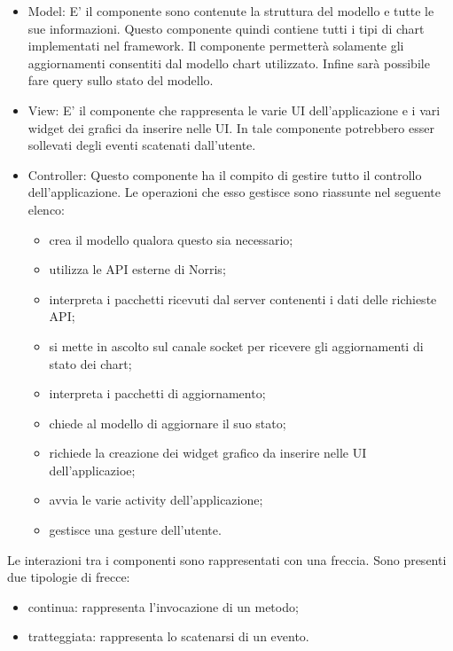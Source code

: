     	\begin{itemize}
            \item{Model:} 
        		E' il componente sono contenute la struttura del modello e tutte le sue informazioni. Questo componente quindi contiene tutti i tipi di chart implementati nel framework. Il componente permetterà solamente gli aggiornamenti consentiti dal modello chart utilizzato. Infine sarà possibile fare query sullo stato del modello.
        	\item{View:}
        		E' il componente che rappresenta le varie UI dell'applicazione e i vari widget dei grafici da inserire nelle UI. In tale componente potrebbero esser sollevati degli eventi scatenati dall'utente.
        	\item{Controller:}
        		Questo componente ha il compito di gestire tutto il controllo dell'applicazione. Le operazioni che esso gestisce sono riassunte nel seguente elenco:
        		\begin{itemize}
        			\item crea il modello qualora questo sia necessario;
        			\item utilizza le API esterne di Norris;
        			\item interpreta i pacchetti ricevuti dal server contenenti i dati delle richieste API;
        			\item si mette in ascolto sul canale socket per ricevere gli aggiornamenti di stato dei chart;
        			\item interpreta i pacchetti di aggiornamento;
        			\item chiede al modello di aggiornare il suo stato;
        			\item richiede la creazione dei widget grafico da inserire nelle UI dell'applicazioe;
        			\item avvia le varie activity dell'applicazione;
        			\item gestisce una gesture dell'utente.
        		\end{itemize}
        \end{itemize}
    	Le interazioni tra i componenti sono rappresentati con una freccia. Sono presenti due tipologie di frecce:
    	\begin{itemize}
    			\item{continua: } rappresenta l'invocazione di un metodo;
    			\item{tratteggiata: } rappresenta lo scatenarsi di un evento.
    		\end{itemize}
